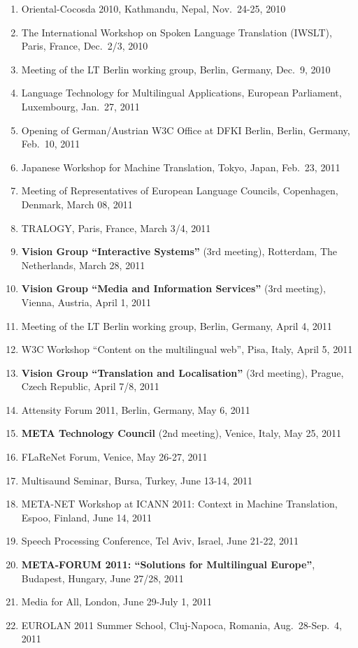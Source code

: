 \documentclass[10pt, plain]{../../metanetpaper}
\begin{document}
\begin{footnotesize}
\begin{enumerate}
\item Oriental-Cocosda 2010, Kathmandu, Nepal, Nov.~24-25, 2010
\item The International Workshop on Spoken Language Translation (IWSLT), Paris, France, Dec.~2/3, 2010
\item Meeting of the LT Berlin working group, Berlin, Germany, Dec.~9, 2010
\item Language Technology for Multilingual Applications, European Parliament, Luxembourg, Jan.~27, 2011
\item Opening of German/Austrian W3C Office at DFKI Berlin, Berlin, Germany, Feb.~10, 2011
\item Japanese Workshop for Machine Translation, Tokyo, Japan, Feb.~23, 2011
\item Meeting of Representatives of European Language Councils, Copenhagen, Denmark, March 08, 2011
\item TRALOGY, Paris, France, March 3/4, 2011
\item \textbf{Vision Group ``Interactive Systems''} (3rd meeting), Rotterdam, The Netherlands, March 28, 2011
\item \textbf{Vision Group ``Media and Information Services''} (3rd meeting), Vienna, Austria, April 1, 2011
\item Meeting of the LT Berlin working group, Berlin, Germany, April 4, 2011
\item W3C Workshop ``Content on the multilingual web'', Pisa, Italy, April 5, 2011
\item \textbf{Vision Group ``Translation and Localisation''} (3rd meeting), Prague, Czech Republic, April 7/8, 2011
\item Attensity Forum 2011, Berlin, Germany, May 6, 2011
\item \textbf{META Technology Council} (2nd meeting), Venice, Italy, May 25, 2011
\item FLaReNet Forum, Venice, May 26-27, 2011
\item Multisaund Seminar, Bursa, Turkey, June 13-14, 2011
\item META-NET Workshop at ICANN 2011: Context in Machine Translation,
Espoo, Finland, June 14, 2011
\item Speech Processing Conference, Tel Aviv, Israel, June 21-22, 2011
\item \textbf{META-FORUM 2011: ``Solutions for Multilingual Europe''}, Budapest, Hungary, June 27/28, 2011
\item Media for All, London, June 29-July 1, 2011
\item EUROLAN 2011 Summer School, Cluj-Napoca, Romania, Aug.~28-Sep.~4, 2011

\end{enumerate}
\end{footnotesize}
\end{document}
